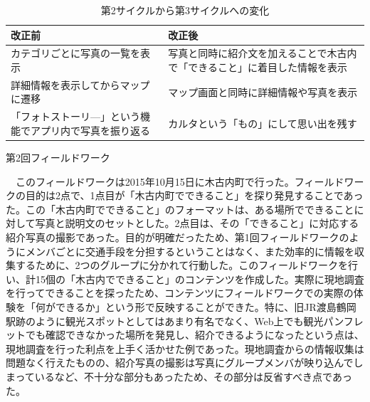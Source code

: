 \begin{table}[htb]
\centering
\addtocounter{table}{+0}
\caption{第2サイクルから第3サイクルへの変化}
  \begin{tabular}{|l|l|} \hline
    改正前&改正後  \\ \hline 
    \parbox{20zw}{カテゴリごとに写真の一覧を表示} & \parbox{20zw}{写真と同時に紹介文を加えることで木古内で「できること」に着目した情報を表示}\rule[-6mm]{0mm}{14mm} \\  \hline
    \parbox{20zw}{詳細情報を表示してからマップに遷移} &\parbox{20zw}{マップ画面と同時に詳細情報や写真を表示}\\ \hline
    \parbox{20zw}{「フォトストーリ—」という機能でアプリ内で写真を振り返る}\rule[-6mm]{0mm}{14mm} & \parbox{20zw}{カルタという「もの」にして思い出を残す}\\ \hline
  \end{tabular} 
\end{table}

\begin{description}
\item[第2回フィールドワーク]\mbox{}
\end{description}
　このフィールドワークは2015年10月15日に木古内町で行った。フィールドワークの目的は2点で、1点目が「木古内町でできること」を探り発見することであった。この「木古内町でできること」のフォーマットは、ある場所でできることに対して写真と説明文のセットとした。2点目は、その「できること」に対応する紹介写真の撮影であった。目的が明確だったため、第1回フィールドワークのようにメンバごとに交通手段を分担するということはなく、また効率的に情報を収集するために、2つのグループに分かれて行動した。このフィールドワークを行い、計15個の「木古内でできること」のコンテンツを作成した。実際に現地調査を行ってできることを探ったため、コンテンツにフィールドワークでの実際の体験を「何ができるか」という形で反映することができた。特に、旧JR渡島鶴岡駅跡のように観光スポットとしてはあまり有名でなく、Web上でも観光パンフレットでも確認できなかった場所を発見し、紹介できるようになったという点は、現地調査を行った利点を上手く活かせた例であった。現地調査からの情報収集は問題なく行えたものの、紹介写真の撮影は写真にグループメンバが映り込んでしまっているなど、不十分な部分もあったため、その部分は反省すべき点であった。

